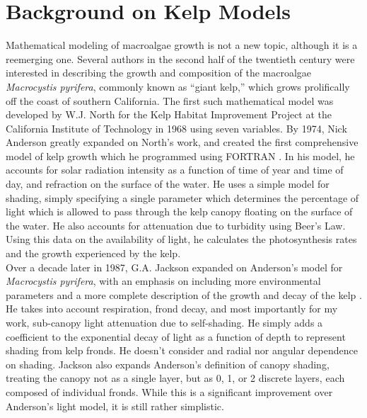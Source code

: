 \section{Background on Kelp Models}

Mathematical modeling of macroalgae growth is not a new topic, although it is a reemerging one.
Several authors in the second half of the twentieth century were interested in describing the growth and composition of the macroalgae \textit{Macrocystis pyrifera}, commonly known as ``giant kelp,'' which grows prolifically off the coast of southern California.
The first such mathematical model was developed by W.J. North for the Kelp Habitat Improvement Project at the California Institute of Technology in 1968 using seven variables.
By 1974, Nick Anderson greatly expanded on North's work, and created the first comprehensive model of kelp growth which he programmed using FORTRAN \cite{anderson_mathematical_1974}.
In his model, he accounts for solar radiation intensity as a function of time of year and time of day, and refraction on the surface of the water.
He uses a simple model for shading, simply specifying a single parameter which determines the percentage of light which is allowed to pass through the kelp canopy floating on the surface of the water.
He also accounts for attenuation due to turbidity using Beer's Law.
Using this data on the availability of light, he calculates the photosynthesis rates and the growth experienced by the kelp. \\[-0.75em]

Over a decade later in 1987, G.A.
Jackson expanded on Anderson's model for \textit{Macrocystis pyrifera}, with an emphasis on including more environmental parameters and a more complete description of the growth and decay of the kelp \cite{jackson_modelling_1987}. 
He takes into account respiration, frond decay, and most importantly for my work, sub-canopy light attenuation due to self-shading.
He simply adds a coefficient to the exponential decay of light as a function of depth to represent shading from kelp fronds.
He doesn't consider and radial nor angular dependence on shading. %
Jackson also expands Anderson's definition of canopy shading, treating the canopy not as a single layer, but as 0, 1, or 2 discrete layers, each composed of individual fronds.
While this is a significant improvement over Anderson's light model, it is still rather simplistic. \\[-0.75em]

